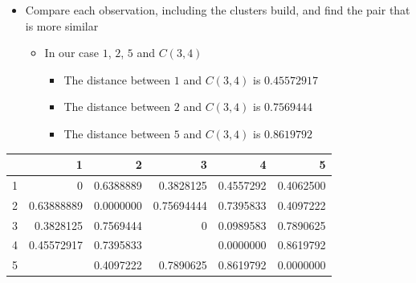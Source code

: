 \documentclass[
  ignorenonframetext,
]{beamer}
\providecommand{\tightlist}{%
  \setlength{\itemsep}{0pt}\setlength{\parskip}{0pt}}\usepackage{longtable,booktabs,array}
\begin{document}
\begin{frame}{}
\label{section-25}
\begin{itemize}
\item
  Compare each observation, including the clusters build, and find the
  pair that is more similar

  \begin{itemize}
  \item
    In our case \(1\), \(2\), \(5\) and \(C(3,4)\)

    \begin{itemize}
    \tightlist
    \item
      The distance between \(1\) and \(C(3,4)\) is \(0.45572917\)\\
    \item
      The distance between \(2\) and \(C(3,4)\) is \(0.7569444\)
    \item
      The distance between \(5\) and \(C(3,4)\) is \(0.8619792\)
    \end{itemize}
  \end{itemize}
\end{itemize}

\begin{table}
\centering
\begin{tabular}[t]{rrrrrr}
\toprule
  & 1 & 2 & 3 & 4 & 5\\
\midrule
1 & 0 & 0.6388889 & 0.3828125 & 0.4557292 & 0.4062500\\
2 & 0.63888889 & 0.0000000 & 0.75694444 & 0.7395833 & 0.4097222\\
3 & 0.3828125 & 0.7569444 & 0 & 0.0989583 & 0.7890625\\
4 & 0.45572917 & 0.7395833 & \cellcolor[HTML]{2C3E50}{\textcolor{white}{0.09895833}} & 0.0000000 & 0.8619792\\
5 & \cellcolor[HTML]{E31A1C}{\textcolor{white}{0.40625}} & 0.4097222 & 0.7890625 & 0.8619792 & 0.0000000\\
\bottomrule
\end{tabular}
\end{table}
\end{frame}
\end{document}
